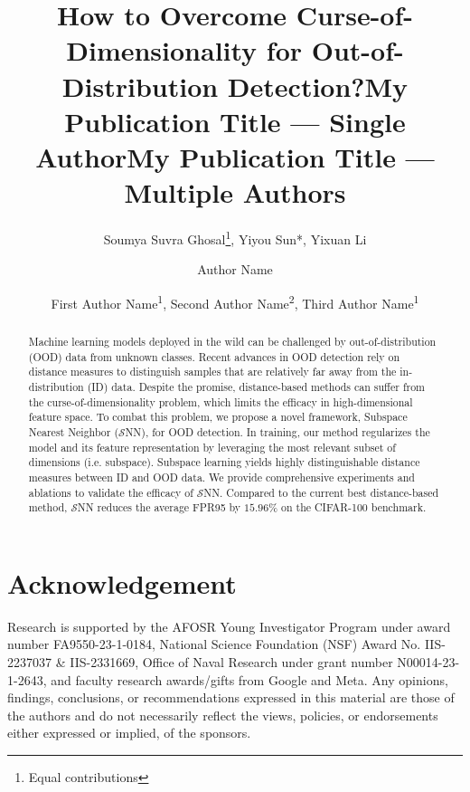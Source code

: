 \documentclass[letterpaper]{article} %
\title{How to Overcome Curse-of-Dimensionality for Out-of-Distribution Detection?}
\author{
    Soumya Suvra Ghosal\footnote{Equal contributions},
    Yiyou Sun*,
    Yixuan Li
}
\title{My Publication Title --- Single Author}
\author {
    Author Name
}
\title{My Publication Title --- Multiple Authors}
\author {
    First Author Name\textsuperscript{\rm 1},
    Second Author Name\textsuperscript{\rm 2},
    Third Author Name\textsuperscript{\rm 1}
}
\def\name{$\mathcal{S}$NN\xspace}
\theoremstyle{plain}
\theoremstyle{definition}
\theoremstyle{remark}
\begin{document}
\maketitle

\begin{abstract}
Machine learning models deployed in the wild can be challenged by out-of-distribution (OOD) data from unknown classes. Recent advances in OOD detection rely on distance measures to distinguish samples that are relatively far away from the in-distribution (ID) data. Despite the promise, distance-based methods can suffer from the curse-of-dimensionality problem, which limits the efficacy in high-dimensional feature space. 
To combat this problem, we propose a novel framework, Subspace Nearest Neighbor (\name), for OOD detection. In training, our method regularizes the model and its feature representation by leveraging the most relevant subset of dimensions (i.e. subspace).  Subspace learning yields highly distinguishable distance measures between ID and OOD data. 
We provide comprehensive experiments and ablations to validate the efficacy of \name. 
Compared to the current best distance-based method, \name reduces the average FPR95 by $15.96\%$ on the CIFAR-100 benchmark.
\end{abstract}









\section*{Acknowledgement}
Research is supported by the AFOSR Young Investigator Program under award number FA9550-23-1-0184, National Science Foundation (NSF) Award No. IIS-2237037 \& IIS-2331669, Office of Naval Research under grant number N00014-23-1-2643, and faculty research awards/gifts from Google and Meta.  Any opinions, findings, conclusions, or recommendations
 expressed in this material are those of the authors and do not necessarily reflect the views, policies, or endorsements either expressed or implied, of the sponsors.


\clearpage

\appendix
\end{document}
